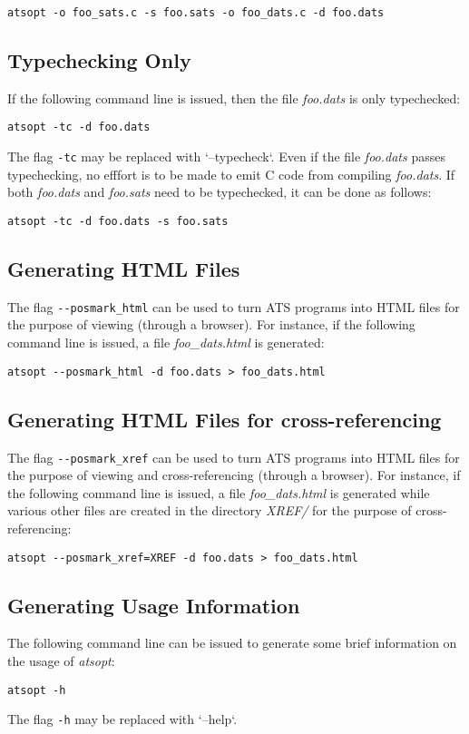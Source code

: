 \begin{verbatim}
atsopt -o foo_sats.c -s foo.sats -o foo_dats.c -d foo.dats
\end{verbatim}

\subsection{Typechecking Only}
If the following command line is issued, then the file {\it foo.dats} is
only typechecked:
\begin{verbatim}
atsopt -tc -d foo.dats
\end{verbatim}
The flag \verb`-tc` may be replaced with `--typecheck`.  Even if the file
{\it foo.dats} passes typechecking, no efffort is to be made to emit C code
from compiling {\it foo.dats}. If both {\it foo.dats} and {\it foo.sats}
need to be typechecked, it can be done as follows:
\begin{verbatim}
atsopt -tc -d foo.dats -s foo.sats
\end{verbatim}

\subsection{Generating HTML Files}
The flag \verb`--posmark_html` can be used to turn ATS programs into HTML
files for the purpose of viewing (through a browser). For instance, if the
following command line is issued, a file {\it foo\_dats.html} is generated:
\begin{verbatim}
atsopt --posmark_html -d foo.dats > foo_dats.html
\end{verbatim}

\subsection{Generating HTML Files for cross-referencing}
The flag \verb`--posmark_xref` can be used to turn ATS programs into HTML
files for the purpose of viewing and cross-referencing (through a
browser). For instance, if the following command line is issued, a file
{\it foo\_dats.html} is generated while various other files are created
in the directory {\it XREF/} for the purpose of cross-referencing:
\begin{verbatim}
atsopt --posmark_xref=XREF -d foo.dats > foo_dats.html
\end{verbatim}

\subsection{Generating Usage Information}
The following command line can be issued to generate some brief information
on the usage of {\it atsopt}:
\begin{verbatim}
atsopt -h
\end{verbatim}
The flag \verb`-h` may be replaced with `--help`.

